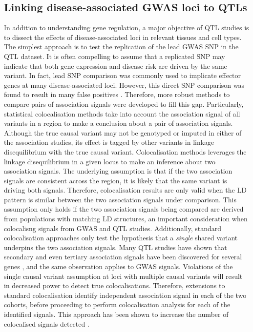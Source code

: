 \subsection{Linking disease-associated GWAS loci to QTLs}
In addition to understanding gene regulation, a major objective of QTL studies is to dissect the effects of disease-associated loci in relevant tissues and cell types. The simplest approach is to test the replication of the lead GWAS SNP in the QTL dataset. It is often compelling to assume that a replicated SNP may indicate that both gene expression and disease risk are driven by the same variant. In fact, lead SNP comparison was commonly used to implicate effector genes at many disease-associated loci. However, this direct SNP comparison was found to result in many false positives \cite{Liu2019-fv}. Therefore, more robust methods to compare pairs of association signals were developed to fill this gap. Particularly, statistical colocalisation methods take into account the association signal of all variants in a region to make a conclusion about a pair of association signals. Although the true causal variant may not be genotyped or imputed in either of the association studies, its effect is tagged by other variants in linkage disequilibrium with the true causal variant. Colocalisation methods leverages the linkage disequilibrium in a given locus to make an inference about two association signals. The underlying assumption is that if the two association signals are consistent across the region, it is likely that the same variant is driving both signals. Therefore, colocalisation results are only valid when the LD pattern is similar between the two association signals under comparison. This assumption only holds if the two association signals being compared are derived from populations with matching LD structures, an important consideration when colocalisng signals from GWAS and QTL studies. Additionally, standard colocalisation approaches only test the hypothesis that a \textit{single} shared variant underpins the two association signals. Many QTL studies have shown that secondary and even tertiary association signals have been discovered for several genes \cite{macromap-eqtl,De_Klein2023-ku}, and the same observation applies to GWAS signals. Violations of the single causal variant assumption at loci with multiple causal variants will result in decreased power to detect true colocalisations. Therefore, extensions to standard colocalisation identify independent association signal in each of the two cohorts, before proceeding to perform colocalisation analysis for each of the identified signals. This approach has been shown to increase the number of colocalised signals detected \cite{Wallace2021-rv}.\\  


